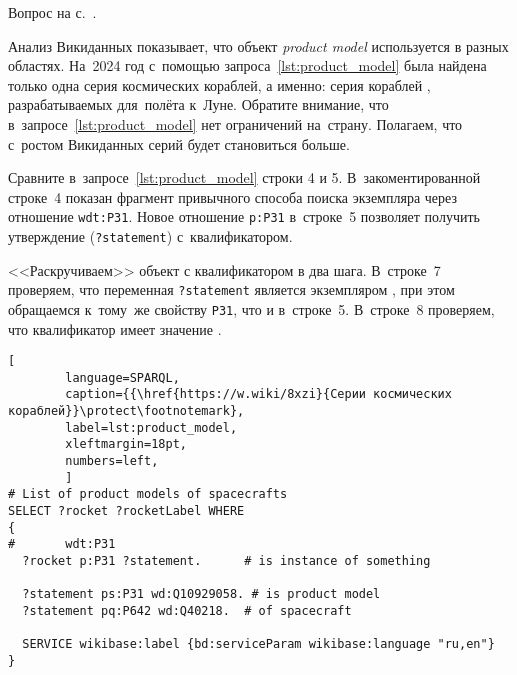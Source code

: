 \begin{task}
    \label{answer:product_model}
    \AnswerBackref Вопрос на с.~\pageref{question:product_model}. 

    Анализ Викиданных показывает, что объект \emph{product model} 
    используется в разных областях. 
    На~2024 год с~помощью запроса~\ref{lst:product_model} 
    была найдена только одна серия космических кораблей, 
    а именно: серия кораблей , 
    разрабатываемых для~полёта к~Луне. 
    Обратите внимание, что в~запросе~\ref{lst:product_model} нет ограничений на~страну. 
    Полагаем, что с~ростом Викиданных серий будет становиться больше. 

    Сравните в~запросе~\ref{lst:product_model} строки 4 и 5. 
    В~закоментированной строке~4 показан фрагмент привычного способа поиска экземпляра через отношение \texttt{wdt:P31}. 
    Новое отношение \texttt{p:P31} в~строке~5 позволяет получить утверждение (\texttt{?statement}) с~квалификатором.

    <<Раскручиваем>> объект с квалификатором в два шага. 
    В~строке~7 проверяем, что переменная \texttt{?statement} является экземпляром , 
    при этом обращаемся к~тому~же свойству \texttt{P31}, что и в~строке~5. 
    В~строке~8 проверяем, что квалификатор  имеет значение . 

\newpage
    \begin{lstlisting}[ 
        language=SPARQL, 
        caption={{\href{https://w.wiki/8xzi}{Серии космических кораблей}}\protect\footnotemark}, 
        label=lst:product_model, 
        xleftmargin=18pt, 
        numbers=left,
        ]
# List of product models of spacecrafts
SELECT ?rocket ?rocketLabel WHERE
{
#       wdt:P31 
  ?rocket p:P31 ?statement.      # is instance of something
  
  ?statement ps:P31 wd:Q10929058. # is product model
  ?statement pq:P642 wd:Q40218.  # of spacecraft
  
  SERVICE wikibase:label {bd:serviceParam wikibase:language "ru,en"}
}
\end{lstlisting}
\end{task}





